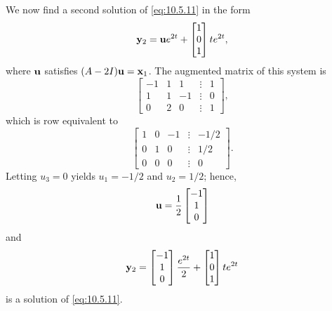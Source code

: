 \documentclass{ximera}
\begin{document}
\begin{example}
\begin{explanation}
We  now find a second solution of  \eqref{eq:10.5.11}  in the form
$$
{\bf y}_2={\bf u}e^{2t}+\begin{bmatrix}1\\0\\1\end{bmatrix}te^{2t},
$$
where ${\bf u}$ satisfies $(A-2I){\bf u=x}_1$.
The  augmented matrix  of this system is
$$
\begin{bmatrix} -1 & 1 & 1 &\vdots & 1\\
1& 1 & -1 &\vdots & 0\\ 0 & 2 & 0 &
\vdots & 1\end{bmatrix}, $$
which is row equivalent to
$$
\begin{bmatrix} 1 & 0 &- 1 &\vdots& -1/2\\ 0 & 1 & 0
&\vdots& 1/2\\ 0 & 0 & 0 &\vdots&0\end{bmatrix}.
$$
Letting $u_3=0$ yields $u_1=-1/2$ and $u_2=1/2$; hence,
$$
{\bf u}=\frac{1}{2}\begin{bmatrix}-1\\1\\0\end{bmatrix}
$$
and
$$
{\bf y}_2=\begin{bmatrix}-1\\1\\0\end{bmatrix}\frac{e^{2t}}{2}+\begin{bmatrix}1\\0\\1\end{bmatrix}te^{2t}
$$
is a solution of  \eqref{eq:10.5.11}.


\end{explanation}
\end{example}
\end{document}
